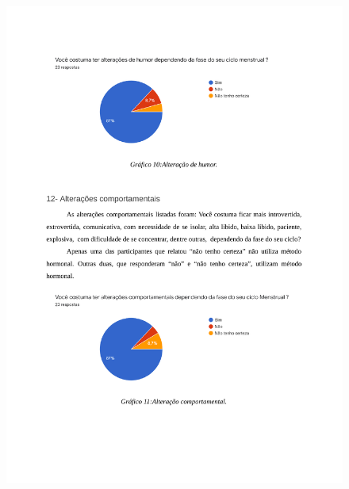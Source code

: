 \begin{apendicesenv}
        \begin{figure}[ht]
            \centering
            \includegraphics[keepaspectratio=true,scale=0.7]{figuras/Tab10.pdf}
        \end{figure}
        

\end{apendicesenv}
